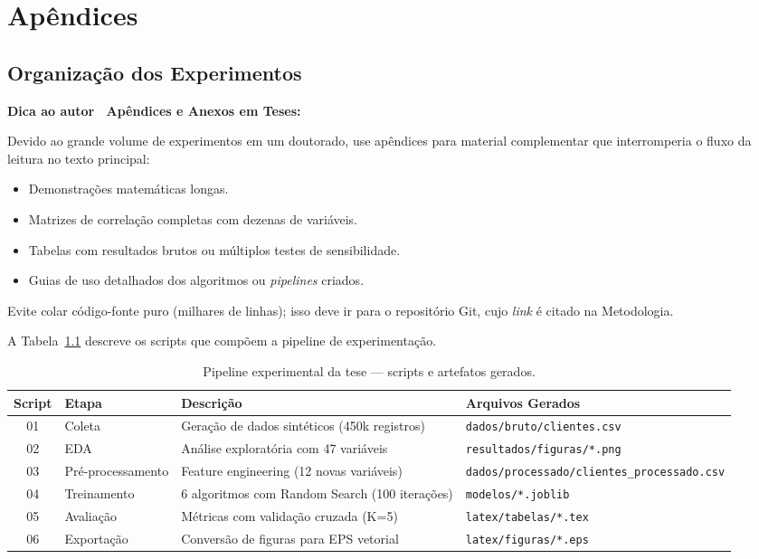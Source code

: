 \documentclass[
    12pt,
    oneside,
    a4paper,
    english,
    brazilian
    ]{abntex2}
\numberwithin{equation}{chapter}
\newenvironment{dica}{%
    \par\medskip
    \color{blue!60!black}\small\itshape
}{%
    \par\medskip
}
\begin{document}
\part*{Apêndices}

\chapter{Organização dos Experimentos}

\begin{dica}
\noindent\textbf{Dica ao autor \textemdash\ Apêndices e Anexos em Teses:}

Devido ao grande volume de experimentos em um doutorado, use apêndices para material complementar que interromperia o fluxo da leitura no texto principal:
\begin{itemize}
    \item Demonstrações matemáticas longas.
    \item Matrizes de correlação completas com dezenas de variáveis.
    \item Tabelas com resultados brutos ou múltiplos testes de sensibilidade.
    \item Guias de uso detalhados dos algoritmos ou \textit{pipelines} criados.
\end{itemize}
Evite colar código-fonte puro (milhares de linhas); isso deve ir para o repositório Git, cujo \textit{link} é citado na Metodologia.
\end{dica}

A Tabela~\ref{tab:pipeline_tese} descreve os scripts que compõem a pipeline de experimentação.

\begin{table}[htbp]
\centering
\caption{Pipeline experimental da tese --- scripts e artefatos gerados.}
\label{tab:pipeline_tese}
\small
\begin{tabular}{cllp{5cm}}
\toprule
\textbf{Script} & \textbf{Etapa} & \textbf{Descrição} & \textbf{Arquivos Gerados} \\
\midrule
01 & Coleta & Geração de dados sintéticos (450k registros) & \texttt{dados/bruto/clientes.csv} \\
02 & EDA & Análise exploratória com 47 variáveis & \texttt{resultados/figuras/*.png} \\
03 & Pré-processamento & Feature engineering (12 novas variáveis) & \texttt{dados/\allowbreak processado/\allowbreak clientes\_processado.csv} \\
04 & Treinamento & 6 algoritmos com Random Search (100 iterações) & \texttt{modelos/*.joblib} \\
05 & Avaliação & Métricas com validação cruzada (K=5) & \texttt{latex/tabelas/*.tex} \\
06 & Exportação & Conversão de figuras para EPS vetorial & \texttt{latex/figuras/*.eps} \\
\bottomrule
\end{tabular}
\end{table}
\end{document}
